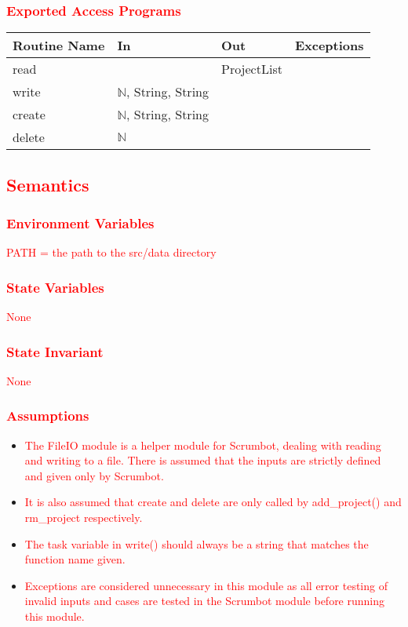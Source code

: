 \documentclass[12pt, titlepage]{article}
\begin{document}
\subsubsection*{\textcolor{red}{Exported Access Programs}}
\textcolor{red}{
\begin{tabular}{|l|l|l|l|}
    \hline
    \textbf{Routine Name} & \textbf{In} & \textbf{Out} & \textbf{Exceptions} \\
    \hline
    read & & ProjectList & \\
    \hline
    write & $\mathbb{N}$, String, String & & \\
    \hline
    create & $\mathbb{N}$, String, String & & \\
    \hline
    delete & $\mathbb{N}$ & & \\
    \hline
\end{tabular}}

\subsection*{\textcolor{red}{Semantics}}
\subsubsection*{\textcolor{red}{Environment Variables}}
\textcolor{red}{PATH = the path to the src/data directory}

\subsubsection* {\textcolor{red}{State Variables}}
\textcolor{red}{None}

\subsubsection* {\textcolor{red}{State Invariant}}
\textcolor{red}{None}

\subsubsection*{\textcolor{red}{Assumptions}}
\begin{itemize}
    \item \textcolor{red}{The FileIO module is a helper module for Scrumbot, dealing with reading and writing to a file. There is assumed that the inputs are strictly defined and given only by Scrumbot.}
    \item \textcolor{red}{It is also assumed that create and delete are only called by add\_project() and rm\_project respectively.}
    \item \textcolor{red}{The task variable in write() should always be a string that matches the function name given.}
    \item \textcolor{red}{Exceptions are considered unnecessary in this module as all error testing of invalid inputs and cases are tested in the Scrumbot module before running this module.}
\end{itemize}
\end{document}
